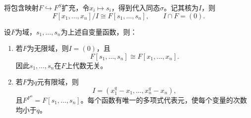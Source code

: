 将包含映射$F\hookrightarrow F^S$扩充，令$x_i\mapsto s_i$，得到代入同态$\sigma$。记其核为$I$，则
\[
F[x_1,\ldots,x_n]/I\cong F[s_1,\ldots,s_n],\qquad I\cap F=(0).
\]

\begin{theorem}\label{p2:poly-functions-many}
设$F$为域，$s_1,\ldots,s_n$为上述自变量函数，则：
\begin{enumerate}
\item 若$F$为无限域，则$I=(0)$，且
\[
F[s_1,\ldots,s_n]\cong F[x_1,\ldots,x_n].
\]
因此$s_1,\ldots,s_n$在$F$上代数无关。
\item 若$F$为$q$元有限域，则
\[
I=(x_1^q-x_1,\ldots,x_n^q-x_n),
\]
且$F^{F^n}=F[s_1,\ldots,s_n]$。每个函数有唯一的多项式代表元，使每个变量的次数均小于$q$。
\end{enumerate}
\end{theorem}
